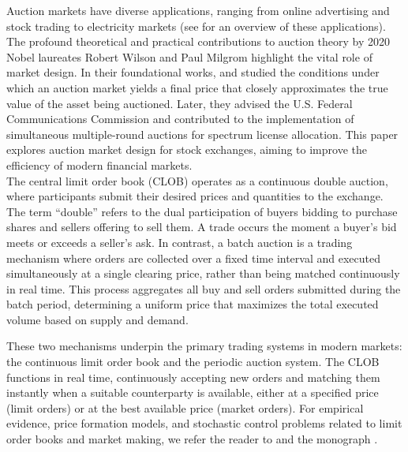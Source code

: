 \documentclass[12pt]{article}
\begin{document}

Auction markets have diverse applications, ranging from online advertising and stock trading to electricity markets (see \cite{milgrom2019auction} for an overview of these applications). The profound theoretical and practical contributions to auction theory by 2020 Nobel laureates Robert Wilson and Paul Milgrom \cite{milgrom2021auction} highlight the vital role of market design. In their foundational works, \cite{Wilson1977} and \cite{Milgrom1979} studied the conditions under which an auction market yields a final price that closely approximates the true value of the asset being auctioned. Later, they advised the U.S. Federal Communications Commission and contributed to the implementation of simultaneous multiple-round auctions for spectrum license allocation. This paper explores auction market design for stock exchanges, aiming to improve the efficiency of modern financial markets. \\

The central limit order book (CLOB) operates as a continuous double auction, where participants submit their desired prices and quantities to the exchange. The term ``double'' refers to the dual participation of buyers bidding to purchase shares and sellers offering to sell them. A trade occurs the moment a buyer's bid meets or exceeds a seller's ask. In contrast, a batch auction is a trading mechanism where orders are collected over a fixed time interval and executed simultaneously at a single clearing price, rather than being matched continuously in real time. This process aggregates all buy and sell orders submitted during the batch period, determining a uniform price that maximizes the total executed volume based on supply and demand. 

These two mechanisms underpin the primary trading systems in modern markets: the continuous limit order book and the periodic auction system. The CLOB functions in real time, continuously accepting new orders and matching them instantly when a suitable counterparty is available, either at a specified price (limit orders) or at the best available price (market orders). For empirical evidence, price formation models, and stochastic control problems related to limit order books and market making, we refer the reader to \cite{avellaneda2008high,gayduk2018endogenous,cont2010stochastic,gueant2013dealing,foucault1999order,colliard2012trading,baldacci2023mean,barucci2025market} and the monograph \cite{cartea2015algorithmic}.
\end{document}
